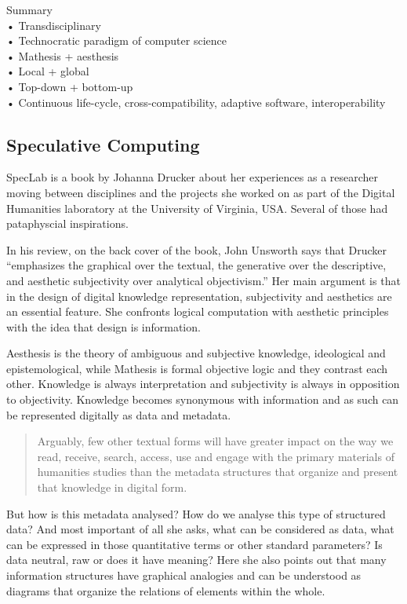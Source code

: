 \begin{shaded}
  Summary\\
  •	Transdisciplinary\\
  •	Technocratic paradigm of computer science\\
  •	Mathesis + aesthesis\\
  •	Local + global\\
  •	Top-down + bottom-up\\
  •	Continuous life-cycle, cross-compatibility, adaptive software, interoperability
\end{shaded}


\subsection{Speculative Computing}

SpecLab \citep{Drucker2009} is a book by Johanna Drucker about her experiences as a researcher moving between disciplines and the projects she worked on as part of the Digital Humanities laboratory at the University of Virginia, USA\@. Several of those had pataphyscial inspirations.

In his review, on the back cover of the book, John Unsworth says that Drucker ``emphasizes the graphical over the textual, the generative over the descriptive, and aesthetic subjectivity over analytical objectivism.'' Her main argument is that in the design of digital knowledge representation, subjectivity and aesthetics are an essential feature. She confronts logical computation with aesthetic principles with the idea that design is information.

Aesthesis is the theory of ambiguous and subjective knowledge, ideological and epistemological, while Mathesis is formal objective logic and they contrast each other. Knowledge is always interpretation and subjectivity is always in opposition to objectivity. Knowledge becomes synonymous with information and as such can be represented digitally as data and metadata.

\begin{quote}
  Arguably, few other textual forms will have greater impact on the way we read, receive, search, access, use and engage with the primary materials of humanities studies than the metadata structures that organize and present that knowledge in digital form. \citep[p.9]{Drucker2009}
\end{quote}

But how is this metadata analysed? How do we analyse this type of structured data? And most important of all she asks, what can be considered as data, what can be expressed in those quantitative terms or other standard parameters? Is data neutral, raw or does it have meaning? Here she also points out that many information structures have graphical analogies and can be understood as diagrams that organize the relations of elements within the whole.

